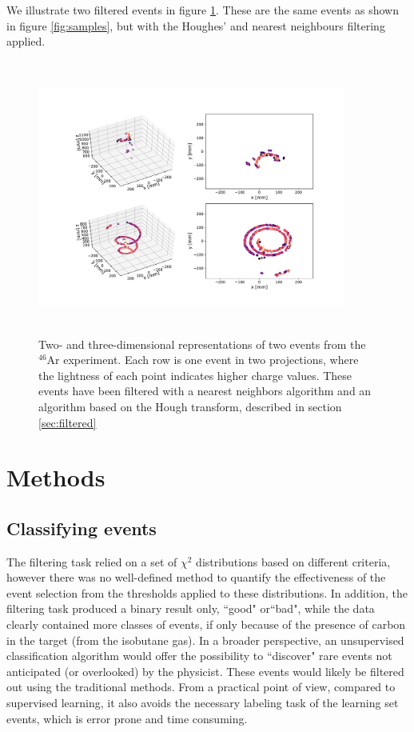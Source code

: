 \documentclass[review,number,sort&compress]{elsarticle}
\begin{document}
We illustrate two filtered events in figure \ref{fig:samples_filtered}. These are the same events as shown in figure \ref{fig:samples}, but with the Houghes' and nearest neighbours filtering applied. 

\begin{figure}[ht]
\centering
\includegraphics[width=0.9\textwidth, height=9cm]{plots/display_eventsclean_.pdf}
\caption[Displaying filtered events in 2D and 3D]{Two- and three-dimensional representations of two events from the ${}^{46}$Ar experiment. Each row is one event in two projections, where the lightness of each point indicates higher charge values. These events have been filtered with a nearest neighbors algorithm and an algorithm based on the Hough transform, described in section \ref{sec:filtered}}\label{fig:samples_filtered}
\end{figure}


\section{Methods}\label{sec:methods}

\subsection{Classifying  events} 
The filtering task relied on a set of $\chi^2$ distributions based on different criteria, however there was no well-defined method to quantify the effectiveness of the event selection from the thresholds applied to these distributions. In addition, the filtering task produced a binary result only, ``good" or``bad", while the data clearly contained more classes of events, if only because of the presence of carbon in the target (from the isobutane gas). In a broader perspective, an unsupervised classification algorithm would offer the possibility to ``discover" rare events not anticipated (or overlooked) by the physicist. These events would likely be filtered out using the traditional methods. From a practical point of view, compared to supervised learning, it also avoids the necessary labeling task of the learning set events, which is error prone and time consuming.
\end{document}

